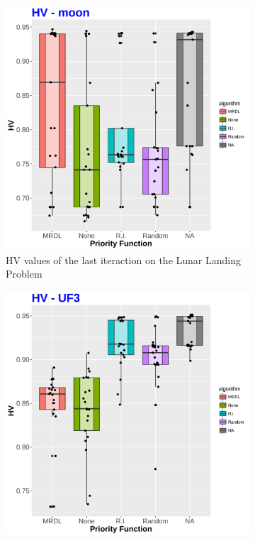 \begin{figure}[!t]

	\begin{subfigure}[b]{0.33\textwidth}
		\centering
		\includegraphics[width=1\textwidth, height=1\textwidth]{images/moon_HV}
		\caption{HV values of the last iteraction on the Lunar Landing Problem}
	\end{subfigure}
	\begin{subfigure}[b]{0.33\textwidth}
		\centering
	\includegraphics[width=1\textwidth, height=1\textwidth]{images/UF3_HV}

\end{subfigure}
\end{figure}
